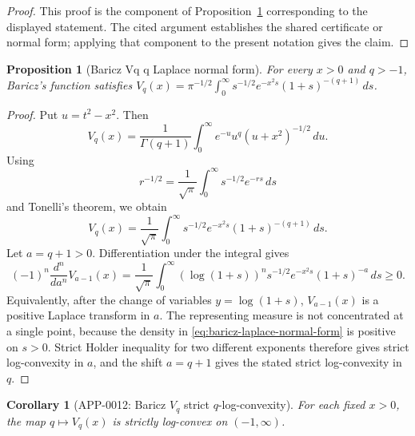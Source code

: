 \documentclass[11pt]{article}
\numberwithin{equation}{section}
\newtheorem{proposition}[theorem]{Proposition}
\newtheorem{corollary}[theorem]{Corollary}
\theoremstyle{definition}
\theoremstyle{remark}
\newcommand{\1}{\mathbf 1}
\begin{document}
\begin{proof}
This proof is the component of Proposition~\ref{res:baricz-vq-q-laplace-normal-form} corresponding to the displayed statement.  The cited argument establishes the shared certificate or normal form; applying that component to the present notation gives the claim.
\end{proof}

\begin{proposition}[Baricz Vq q Laplace normal form]
\label{res:baricz-vq-q-laplace-normal-form}
For every \(x>0\) and \(q>-1\), Baricz's function satisfies \(V_q(x)=\pi^{-1/2}\int_0^\infty s^{-1/2}e^{-x^2s}(1+s)^{-(q+1)}\,ds\).
\end{proposition}

\begin{proof}
Put \(u=t^2-x^2\).  Then
\begin{equation}
\label{eq:baricz-u-normal-form}
V_q(x)=\frac1{\Gamma(q+1)}
\int_0^\infty e^{-u}u^q(u+x^2)^{-1/2}\,du.
\end{equation}
Using
\[
r^{-1/2}=\frac1{\sqrt\pi}\int_0^\infty s^{-1/2}e^{-rs}\,ds
\]
and Tonelli's theorem, we obtain
\begin{equation}
\label{eq:baricz-laplace-normal-form}
V_q(x)=\frac1{\sqrt\pi}\int_0^\infty
s^{-1/2}e^{-x^2s}(1+s)^{-(q+1)}\,ds.
\end{equation}
Let \(a=q+1>0\).  Differentiation under the integral gives
\begin{equation}
\label{eq:baricz-complete-monotonicity}
(-1)^n\frac{d^n}{da^n}V_{a-1}(x)
=\frac1{\sqrt\pi}\int_0^\infty
(\log(1+s))^n s^{-1/2}e^{-x^2s}(1+s)^{-a}\,ds\ge0.
\end{equation}
Equivalently, after the change of variables \(y=\log(1+s)\), \(V_{a-1}(x)\) is a positive Laplace transform in \(a\).  The representing measure is not concentrated at a single point, because the density in \eqref{eq:baricz-laplace-normal-form} is positive on \(s>0\).  Strict Holder inequality for two different exponents therefore gives strict log-convexity in \(a\), and the shift \(a=q+1\) gives the stated strict log-convexity in \(q\).
\end{proof}

\begin{corollary}[APP-0012: Baricz \(V_q\) strict \(q\)-log-convexity]
\label{thm:baricz-vq-strict-logconvexity}
For each fixed \(x>0\), the map \(q\mapsto V_q(x)\) is strictly log-convex on \((-1,\infty)\).


\end{corollary}
\end{document}
